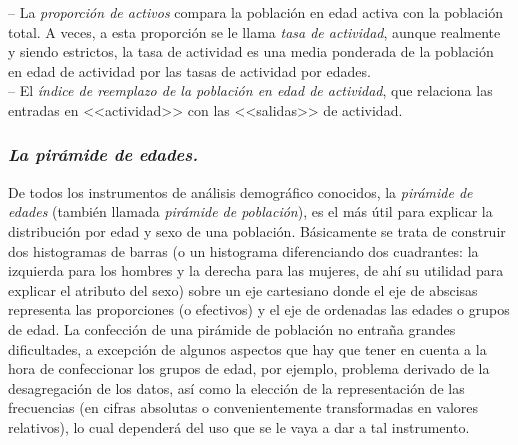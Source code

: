 \vspace{-0.3cm}
-- La \textit{proporci\'on de activos} compara la poblaci\'on en edad activa con la poblaci\'on total. A veces, a esta proporci\'on se le llama \textit{tasa de actividad}, aunque realmente y siendo estrictos, la tasa de actividad es una media ponderada de la poblaci\'on en edad de actividad por las tasas de actividad por edades.\\

\vspace{-0.3cm}
-- El \textit{\'indice de reemplazo de la poblaci\'on en edad de actividad}, que relaciona las entradas en <<actividad>> con las <<salidas>> de actividad.

\subsubsection*{\textit{La pir\'amide de edades.}}

De todos los instrumentos de an\'alisis demogr\'afico conocidos, la \textit{pir\'amide de edades} (tambi\'en llamada \textit{pir\'amide de poblaci\'on}), es el m\'as \'util para explicar la distribuci\'on por edad y sexo de una poblaci\'on. B\'asicamente se trata de construir dos histogramas de barras (o un histograma diferenciando dos cuadrantes: la izquierda para los hombres y la derecha para las mujeres, de ah\'i su utilidad para explicar el atributo del sexo) sobre un eje cartesiano donde el eje de abscisas representa las proporciones (o efectivos) y el eje de ordenadas las edades o grupos de edad. La confecci\'on de una pir\'amide de poblaci\'on no entra\~na grandes dificultades, a excepci\'on de algunos aspectos que hay que tener en cuenta a la hora de confeccionar los grupos de edad, por ejemplo, problema derivado de la desagregaci\'on de los datos, as\'i como la elecci\'on de la representaci\'on de las frecuencias (en cifras absolutas o convenientemente transformadas en valores relativos), lo cual depender\'a del uso que se le vaya a dar a tal instrumento.\\

